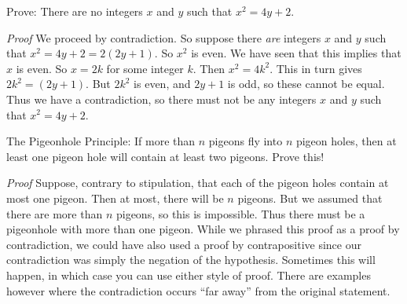 \documentclass[11pt,]{book}
\makeatletter
\theoremstyle{ptxplainnotitle}
\theoremstyle{ptxplaintitle}
\renewcommand*{\proofname}{Proof}
\renewenvironment{proof}[1][\proofname]{\par
  \pushQED{\qed}%
  \normalfont \topsep6\p@\@plus6\p@\relax
  \trivlist
  \item\relax
    {\itshape
    #1\@addpunct{.}}\hspace\labelsep\ignorespaces
}{%
  \popQED\endtrivlist\@endpefalse
}
\theoremstyle{ptxdefinitionnotitle}
\theoremstyle{ptxdefinitiontitle}
\theoremstyle{ptxdefinitionnotitle}
\theoremstyle{ptxdefinitiontitle}
\theoremstyle{ptxdefinitionnotitle}
\theoremstyle{ptxdefinitiontitle}
\theoremstyle{ptxdefinitiontitlenonumber}
\theoremstyle{ptxdefinitiontitlenonumber}
\numberwithin{equation}{chapter}
\makeatother
\begin{document}
\begin{example}\label{example-69}
\hypertarget{p-2341}{}%
Prove: There are no integers \(x\) and \(y\) such that \(x^2  = 4y + 2\).%
\par\smallskip%
\noindent\textbf{}\hypertarget{solution-256}{}\begin{proof}\hypertarget{proof-28}{}
\hypertarget{p-2342}{}%
We proceed by contradiction. So suppose there \emph{are} integers \(x\) and \(y\) such that \(x^2 = 4y + 2 = 2(2y + 1)\). So \(x^2\) is even. We have seen that this implies that \(x\) is even. So \(x = 2k\) for some integer \(k\). Then \(x^2 = 4k^2\). This in turn gives \(2k^2 = (2y + 1)\). But \(2k^2\) is even, and \(2y + 1\) is odd, so these cannot be equal. Thus we have a contradiction, so there must not be any integers \(x\) and \(y\) such that \(x^2 = 4y + 2\).%
\end{proof}
\end{example}
\begin{example}\label{example-70}
\hypertarget{p-2343}{}%
The Pigeonhole Principle: If more than \(n\) pigeons fly into \(n\) pigeon holes, then at least one pigeon hole will contain at least two pigeons. Prove this!%
\par\smallskip%
\noindent\textbf{}\hypertarget{solution-257}{}\begin{proof}\hypertarget{proof-29}{}
\hypertarget{p-2344}{}%
Suppose, contrary to stipulation, that each of the pigeon holes contain at most one pigeon. Then at most, there will be \(n\) pigeons. But we assumed that there are more than \(n\) pigeons, so this is impossible. Thus there must be a pigeonhole with more than one pigeon.%
\end{proof}
\hypertarget{p-2345}{}%
While we phrased this proof as a proof by contradiction, we could have also used a proof by contrapositive since our contradiction was simply the negation of the hypothesis. Sometimes this will happen, in which case you can use either style of proof. There are examples however where the contradiction occurs ``far away'' from the original statement.%
\end{example}
\typeout{************************************************}
\typeout{************************************************}
\end{document}
